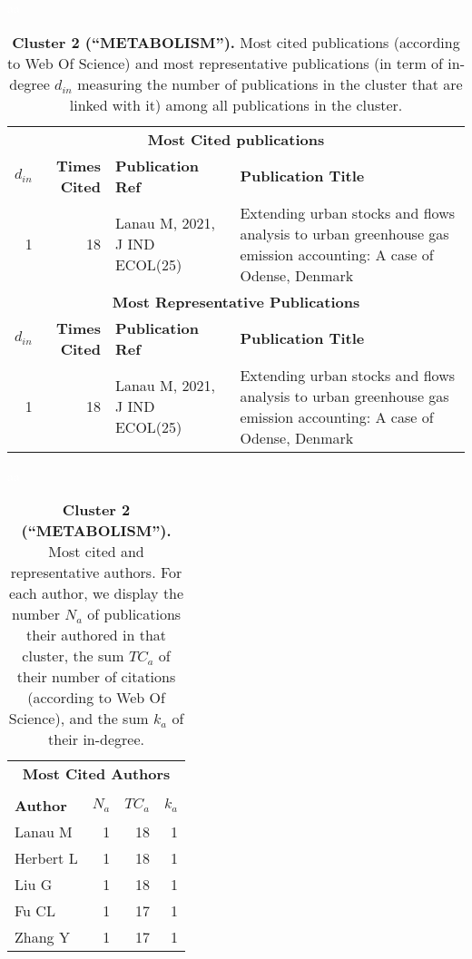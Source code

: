 \documentclass[a4paper,11pt]{report}
\begin{document}
\begin{landscape}
\begin{table}[!ht]
\caption*{{\bf Cluster 2 (``METABOLISM'').} Most cited publications (according to Web Of Science) and most representative publications (in term of in-degree $d_{in}$ measuring the number of publications in the cluster that are linked with it) among all publications in the cluster.}
\textcolor{white}{aa}\\
{\scriptsize\begin{tabular}{|r r p{7cm} p{17cm}|}
\hline
\multicolumn{4}{|c|}{{\bf Most Cited publications}}\\
{\bf $d_{in}$} & {\bf Times Cited} & {\bf Publication Ref} & {\bf Publication Title} \\
1 & 18 & Lanau M, 2021, J IND ECOL(25) & Extending urban stocks and flows analysis to urban greenhouse gas emission accounting: A case of Odense, Denmark\\
\hline
\hline
\multicolumn{4}{|c|}{{\bf Most Representative Publications}}\\
{\bf $d_{in}$} & {\bf Times Cited} & {\bf Publication Ref} & {\bf Publication Title} \\
1 & 18 & Lanau M, 2021, J IND ECOL(25) & Extending urban stocks and flows analysis to urban greenhouse gas emission accounting: A case of Odense, Denmark\\
\hline
\end{tabular}
}
\end{table}

\clearpage

\begin{table}[!ht]
\caption*{{\bf Cluster 2 (``METABOLISM'').} Most cited and representative authors. For each author, we display the number $N_a$ of publications their authored in that cluster, the sum $TC_a$ of their number of citations (according to Web Of Science), and the sum $k_a$ of their in-degree. }
\textcolor{white}{aa}\\
{\scriptsize\begin{tabular}{|l r r r|}
\hline
\multicolumn{4}{|c|}{{\bf Most Cited Authors}}\\
&&&\\
{\bf Author} & {\bf $N_a$} & {\bf $TC_a$} & {\bf $k_a$}\\
Lanau M & 1 & 18 & 1 \\
Herbert L & 1 & 18 & 1 \\
Liu G & 1 & 18 & 1 \\
Fu CL & 1 & 17 & 1 \\
Zhang Y & 1 & 17 & 1 \\
\hline


\end{tabular}}
\end{table}
\end{landscape}
\end{document}
